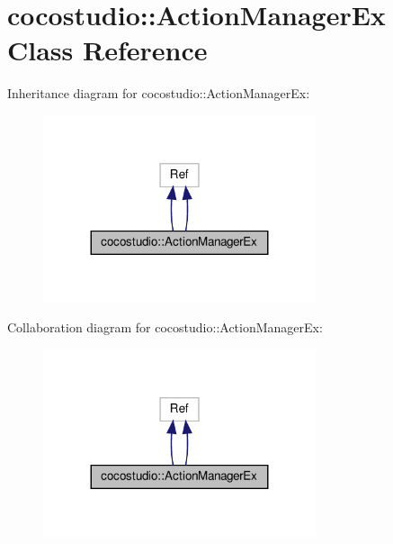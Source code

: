 \hypertarget{classcocostudio_1_1ActionManagerEx}{}\section{cocostudio\+:\+:Action\+Manager\+Ex Class Reference}
\label{classcocostudio_1_1ActionManagerEx}


Inheritance diagram for cocostudio\+:\+:Action\+Manager\+Ex\+:
\nopagebreak
\begin{figure}[H]
\begin{center}
\leavevmode
\includegraphics[width=227pt]{classcocostudio_1_1ActionManagerEx__inherit__graph}
\end{center}
\end{figure}


Collaboration diagram for cocostudio\+:\+:Action\+Manager\+Ex\+:
\nopagebreak
\begin{figure}[H]
\begin{center}
\leavevmode
\includegraphics[width=227pt]{classcocostudio_1_1ActionManagerEx__coll__graph}
\end{center}
\end{figure}
